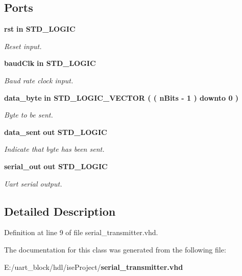 \subsection*{Ports}
 \begin{DoxyCompactItemize}
\item 
{\bf rst}  {\bfseries {\bfseries in }} {\bfseries S\-T\-D\-\_\-\-L\-O\-G\-I\-C } \label{classserial__transmitter_a69a21b2223906c06964e170ed8472b60}

\begin{DoxyCompactList}\small\item\em Reset input. \end{DoxyCompactList}\item 
{\bf baud\-Clk}  {\bfseries {\bfseries in }} {\bfseries S\-T\-D\-\_\-\-L\-O\-G\-I\-C } \label{classserial__transmitter_a37deab9bf997cca5bdba26c411a2c051}

\begin{DoxyCompactList}\small\item\em Baud rate clock input. \end{DoxyCompactList}\item 
{\bf data\-\_\-byte}  {\bfseries {\bfseries in }} {\bfseries S\-T\-D\-\_\-\-L\-O\-G\-I\-C\-\_\-\-V\-E\-C\-T\-O\-R (  ( n\-Bits -\/   1  )    downto    0  ) } \label{classserial__transmitter_ab901c30d3e4ea5dec40e2cbcd7d9db54}

\begin{DoxyCompactList}\small\item\em Byte to be sent. \end{DoxyCompactList}\item 
{\bf data\-\_\-sent}  {\bfseries {\bfseries out }} {\bfseries S\-T\-D\-\_\-\-L\-O\-G\-I\-C } \label{classserial__transmitter_a5bd0a4b084d0e368d77bac41cc143a73}

\begin{DoxyCompactList}\small\item\em Indicate that byte has been sent. \end{DoxyCompactList}\item 
{\bf serial\-\_\-out}  {\bfseries {\bfseries out }} {\bfseries S\-T\-D\-\_\-\-L\-O\-G\-I\-C } \label{classserial__transmitter_ac65328ce72c56f359addcc4876d091de}

\begin{DoxyCompactList}\small\item\em Uart serial output. \end{DoxyCompactList}\end{DoxyCompactItemize}


\subsection{Detailed Description}


Definition at line 9 of file serial\-\_\-transmitter.\-vhd.



The documentation for this class was generated from the following file\-:\begin{DoxyCompactItemize}
\item 
E\-:/uart\-\_\-block/hdl/ise\-Project/{\bf serial\-\_\-transmitter.\-vhd}\end{DoxyCompactItemize}
